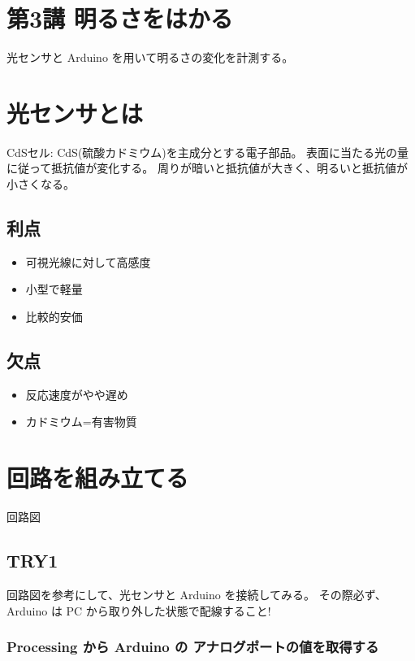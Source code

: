 \documentclass[11pt,a4paper]{jarticle}
\begin{document}
\section*{\LARGE{第3講 明るさをはかる}}
光センサと Arduino を用いて明るさの変化を計測する。


\section{光センサとは}
CdSセル: CdS(硫酸カドミウム)を主成分とする電子部品。
表面に当たる光の量に従って抵抗値が変化する。
周りが暗いと抵抗値が大きく、明るいと抵抗値が小さくなる。

\subsection*{利点}
\begin{itemize}
 \item 可視光線に対して高感度
 \item 小型で軽量
 \item 比較的安価
\end{itemize}
	    
\subsection*{欠点}
\begin{itemize}
 \item 反応速度がやや遅め
 \item カドミウム=有害物質
\end{itemize}


\section{回路を組み立てる}

回路図

\subsection*{TRY1}
回路図を参考にして、光センサと Arduino を接続してみる。
その際必ず、Arduino は PC から取り外した状態で配線すること!

\subsubsection*{Processing から Arduino の アナログポートの値を取得する}
\end{document}
